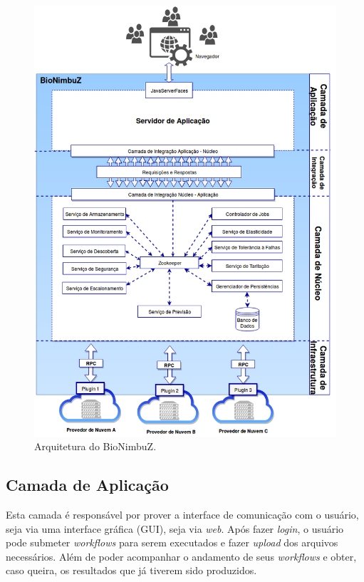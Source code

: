 \begin{figure}[htbp]
	\centerline{\includegraphics[scale=0.45]{img/ArquiteturaBioNimbuZ.png}}
	\caption{Arquitetura do BioNimbuZ\cite{Alves_BioNimbuz}.}
	\label{Arquitetura}
\end{figure}



\subsection{Camada de Aplicação} Esta camada é responsável por prover a interface de comunicação com o usuário, seja via uma interface gráfica (GUI), seja via \textit{web}. Após fazer \textit{login}, o usuário pode submeter \textit{workflows} para serem executados e fazer \textit{upload} dos arquivos necessários. Além de poder acompanhar o andamento de seus \textit{workflows} e obter, caso queira, os resultados que já tiverem sido produzidos.

